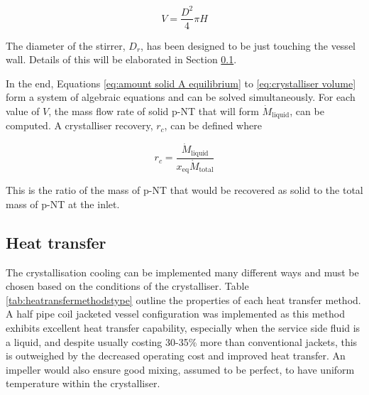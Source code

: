 \begin{equation} \label{eq:crystalliser volume}
    V = \frac{D^2}{4} \pi H
\end{equation}

\noindent The diameter of the stirrer, $D_r$, has been designed to be just touching the vessel wall. Details of this will be elaborated in Section \ref{sec:heat transfer}.

In the end, Equations \ref{eq:amount solid A equilibrium} to \ref{eq:crystalliser volume} form a system of algebraic equations and can be solved simultaneously. For each value of $V$, the mass flow rate of solid p-NT that will form $\dot{M}_{\mathrm{liquid}}$, can be computed. A crystalliser recovery, $r_c$, can be defined where

\begin{equation}
    r_c = \frac{\dot{M}_{\mathrm{liquid}}}{x_{\mathrm{eq}} \dot{M}_{\mathrm{total}}}
\end{equation}

\noindent This is the ratio of the mass of p-NT that would be recovered as solid to the total mass of p-NT at the inlet.

\subsection{Heat transfer}\label{sec:heat transfer}

The crystallisation cooling can be implemented many different ways and must be chosen based on the conditions of the crystalliser. Table \ref{tab:heatransfermethodstype} outline the properties of each heat transfer method. A half pipe coil jacketed vessel configuration was implemented as this method exhibits excellent heat transfer capability, especially when the service side fluid is a liquid, and despite usually costing 30-35\% more than conventional jackets, this is outweighed by the decreased operating cost and improved heat transfer. An impeller would also ensure good mixing, assumed to be perfect, to have uniform temperature within the crystalliser. 

